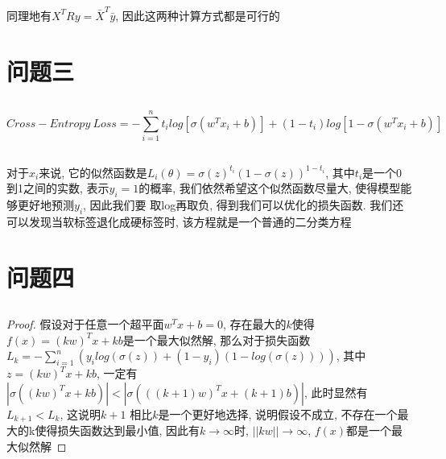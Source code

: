 \documentclass[12pt, a4paper]{article}
\begin{document}
同理地有$X^TRy = \bar{X}^T \bar{y}$, 因此这两种计算方式都是可行的

\section{问题三}


\subsection{}

\begin{equation*}
    Cross-Entropy \ Loss = - \sum_{i=1}^n t_i log[\sigma(w^T x_i + b)] + (1-t_i)log[1-\sigma(w^T x_i + b)]
\end{equation*}

\subsection{}

对于$x_i$来说, 它的似然函数是$L_i(\theta) = \sigma(z)^{t_i}(1-\sigma(z))^{1-t_i} $, 其中$t_i$是一个0到1之间的实数, 表示$y_i=1$的概率, 
我们依然希望这个似然函数尽量大, 使得模型能够更好地预测$y_i$, 因此我们要
取log再取负, 得到我们可以优化的损失函数. 我们还可以发现当软标签退化成硬标签时, 该方程就是一个普通的二分类方程

\section{问题四}


\subsection{}

\newtheorem*{proof}{Proof}

\begin{proof}
    假设对于任意一个超平面$w^T x + b = 0$, 存在最大的$k$使得$f(x) = (kw)^T x + kb$是一个最大似然解, 
    那么对于损失函数$L_k = - \sum_{i=1}^n(y_i log(\sigma(z))+(1-y_i)(1-log(\sigma(z))))$, 其中$z = (kw)^T x + kb$, 
    一定有$|\sigma((kw)^T x + kb)| < |\sigma(((k+1)w)^T x + (k+1)b)|$, 此时显然有$L_{k+1}<L_k$, 这说明$k+1$
    相比$k$是一个更好地选择, 说明假设不成立, 不存在一个最大的k使得损失函数达到最小值, 因此有$k \rightarrow \infty$时, 
    $||kw|| \rightarrow \infty$, $f(x)$都是一个最大似然解
\end{proof}

\subsection{}
\end{document}

